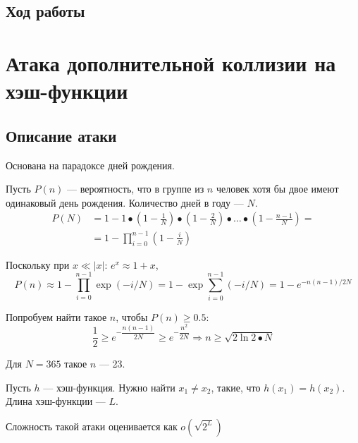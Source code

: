 \documentclass[a4paper, 14pt]{extarticle}
\begin{document}
\subsection{Ход работы}
\lipsum[1] %

\section{Атака дополнительной коллизии на хэш-функции}
\subsection{Описание атаки}
Основана на парадоксе дней рождения.

Пусть $P(n)$ --- вероятность, что в группе из $n$ человек хотя бы двое имеют одинаковый день рождения. Количество дней в году --- $N$.
\begin{equation}
    \begin{split}
        P(N) &= 1 - 1 \bullet \left( 1 - \frac{1}{N} \right) \bullet \left( 1 - \frac{2}{N} \right) \bullet \ldots \bullet \left( 1 - \frac{n-1}{N} \right) = \\
             &= 1 - \prod_{i=0}^{n-1} \left( 1 - \frac{i}{N} \right)
    \end{split}
\end{equation}

Поскольку при $x \ll |x|$: $e^x \approx 1 + x$,
\begin{equation}
    P(n) \approx 1 - \prod_{i=0}^{n-1} \exp{(-i/N)} = 1 - \exp \sum_{i=0}^{n-1} (-i / N) = 1 - e^{-n(n-1)/2N}
\end{equation}

Попробуем найти такое $n$, чтобы $P(n) \ge 0.5$:
\begin{equation}
    \frac{1}{2} \ge e^{- \dfrac{n(n-1)}{2N} } \ge e^{- \dfrac{n^2}{2N}} \Rightarrow n \ge \sqrt{2 \ln 2 \bullet N}
\end{equation}

Для $N=365$ такое $n$ --- 23.

Пусть $h$ --- хэш-функция. Нужно найти $x_1 \ne x_2$, такие, что $h(x_1) = h(x_2)$. Длина хэш-функции --- $L$.

Сложность такой атаки оценивается как $o(\sqrt{2^L})$
\end{document}

